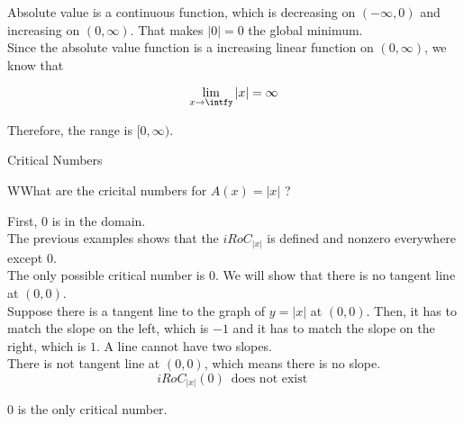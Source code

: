 \documentclass{ximera}
\begin{document}
Absolute value is a continuous function, which is decreasing on $(-\infty, 0)$ and increasing on $(0, \infty)$. That makes $| 0 | = 0$ the global minimum. \\


Since the absolute value function is a increasing linear function on $(0, \infty)$, we know that

\[
\lim\limits_{x \to \intfy}| x | = \infty
\]



Therefore, the range is $[0, \infty)$.








\begin{example}  Critical Numbers


WWhat are the cricital numbers for $A(x) = | x |$ ?



\begin{explanation}


First, $0$ is in the domain. \\

The previous examples shows that the $iRoC_{|x|}$ is defined and nonzero everywhere except $0$. \\

The only possible critical number is $0$.  We will show that there is no tangent line at $(0,0)$. \\


Suppose there is a tangent line to the graph of $y = | x |$ at $(0,0)$.  Then, it has to match the slope on the left, which is $-1$ and it has to match the slope on the right, which is $1$.  A line cannot have two slopes. \\ 


There is not tangent line at $(0,0)$, which means there is no slope. \\



\[
iRoC_{|x|}(0) \, \text{ does not exist }
\]


$0$ is the only critical number.



\end{explanation}


\end{example}
\end{document}

